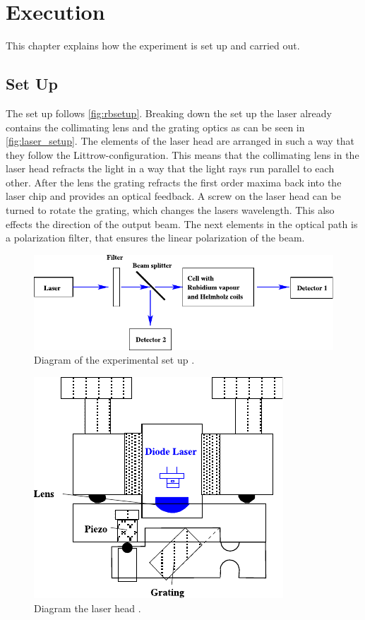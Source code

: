 \section{Execution}
\label{sec:execution}

This chapter explains how the experiment is set up and carried out.

\subsection{Set Up}
\label{sec:setup}

The set up follows \autoref{fig:rbsetup}. Breaking down the set up the laser already contains the collimating lens and the grating optics as can be seen in \autoref{fig:laser_setup}.
The elements of the laser head are arranged in such a way that they follow the Littrow-configuration. 
This means that the collimating lens in the laser head refracts the light in a way that the light rays run parallel to each other.
After the lens the grating refracts the first order maxima back into the laser chip and provides an optical feedback.
A screw on the laser head can be turned to rotate the grating, which changes the lasers wavelength. 
This also effects the direction of the output beam.
The next elements in the optical path is a polarization filter, that ensures the linear polarization of the beam.  

\begin{figure}[H]
    \centering
    \includegraphics{figures/rbsetup.pdf}
    \caption{Diagram of the experimental set up \cite{v60}.}
    \label{fig:rbsetup}
\end{figure}

\begin{figure}[H]
    \centering
    \includegraphics{figures/laser_setup.pdf}
    \caption{Diagram the laser head \cite{v60}.}
    \label{fig:laser_setup}
\end{figure}


